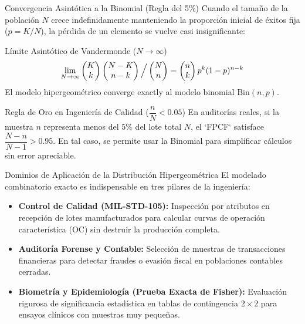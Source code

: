 \documentclass[10pt, aspectratio=169]{beamer}
\begin{document}
\begin{frame}{Convergencia Asintótica a la Binomial (Regla del 5\%)}
  \footnotesize
  Cuando el tamaño de la población $N$ crece indefinidamente manteniendo la proporción inicial de éxitos fija ($p = K/N$), la pérdida de un elemento se vuelve casi insignificante: \pause

  \vspace{0.1cm}
  \begin{block}{Límite Asintótico de Vandermonde ($N \to \infty$)}
    $$\lim_{N \to \infty} \begin{pmatrix} K \\ k \end{pmatrix}\begin{pmatrix} N-K \\ n-k \end{pmatrix} \Big/ \begin{pmatrix} N \\ n \end{pmatrix} = \begin{pmatrix} n \\ k \end{pmatrix} p^k (1-p)^{n-k}$$
    El modelo hipergeométrico converge exactly al modelo binomial $\text{Bin}(n, p)$.
  \end{block}

  \vspace{0.1cm}
  \pause
  \begin{alertblock}{Regla de Oro en Ingeniería de Calidad ($\dfrac{n}{N} < 0.05$)}
    En auditorías reales, si la muestra $n$ representa menos del $5\%$ del lote total $N$, el `FPCF` satisface $\dfrac{N-n}{N-1} > 0.95$. En tal caso, se permite usar la Binomial para simplificar cálculos sin error apreciable.
  \end{alertblock}
\end{frame}

\begin{frame}{Dominios de Aplicación de la Distribución Hipergeométrica}
  \footnotesize
  El modelado combinatorio exacto es indispensable en tres pilares de la ingeniería: \pause

  \vspace{0.2cm}
  \begin{itemize}\itemsep=0.2cm
    \item \textbf{Control de Calidad (MIL-STD-105):} Inspección por atributos en recepción de lotes manufacturados para calcular curvas de operación característica (OC) sin destruir la producción completa. \pause
    \item \textbf{Auditoría Forense y Contable:} Selección de muestras de transacciones financieras para detectar fraudes o evasión fiscal en poblaciones contables cerradas. \pause
    \item \textbf{Biometría y Epidemiología (Prueba Exacta de Fisher):} Evaluación rigurosa de significancia estadística en tablas de contingencia $2 \times 2$ para ensayos clínicos con muestras muy pequeñas.
  \end{itemize}
\end{frame}
\end{document}
